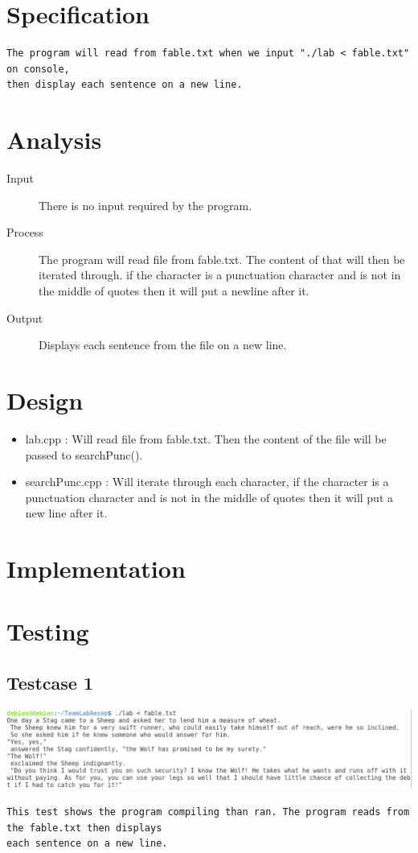 \documentclass{article}
\begin{document}
\newpage\section*{Specification}
\begin{verbatim}
The program will read from fable.txt when we input "./lab < fable.txt" on console, 
then display each sentence on a new line.
\end{verbatim}

\newpage\section*{Analysis}
\begin{description}
  \item[Input] There is no input required by the program.
  \item[Process] The program will read file from fable.txt. The content of that will then be iterated through. if the character is a punctuation character and is not in the middle of quotes then it will put a newline after it.
  \item[Output] Displays each sentence from the file on a new line.
\end{description}

\newpage\section*{Design}
\begin{itemize}
	\item lab.cpp : Will read file from fable.txt. Then the content of the file will be passed to searchPunc().
	\item searchPunc.cpp : Will iterate through each character, if the character is a punctuation character and is not in the middle of quotes then it will put a new line after it.
\end{itemize}

\newpage\section*{Implementation}
\newpage{}
\newpage
\newpage

\newpage\section*{Testing}
\subsection*{Testcase 1}
\includegraphics[scale=0.5]{test.png} 
\begin{verbatim}
This test shows the program compiling than ran. The program reads from the fable.txt then displays
each sentence on a new line.
\end{verbatim}
\newpage
\end{document}
